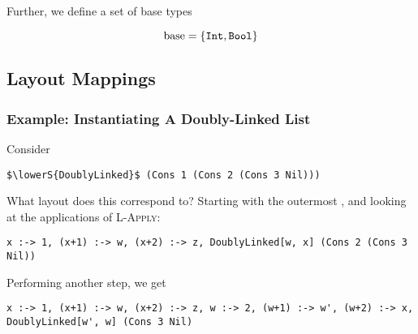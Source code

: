\documentclass[10pt]{article}
\begin{document}
Further, we define a set of base types

\[
  \textnormal{base} = \{\texttt{Int}, \texttt{Bool}\}
\]

\subsection{Layout Mappings}

%
%
%
%
%
%

\subsubsection{Example: Instantiating A Doubly-Linked List}

Consider

\begin{lstlisting}
$\lowerS{DoublyLinked}$ (Cons 1 (Cons 2 (Cons 3 Nil)))
\end{lstlisting}

What layout does this correspond to? Starting with the outermost , and looking
at the applications of \textsc{L-Apply}:

\begin{lstlisting}
x :-> 1, (x+1) :-> w, (x+2) :-> z, DoublyLinked[w, x] (Cons 2 (Cons 3 Nil))
\end{lstlisting}

Performing another step, we get

\begin{lstlisting}
x :-> 1, (x+1) :-> w, (x+2) :-> z, w :-> 2, (w+1) :-> w', (w+2) :-> x, DoublyLinked[w', w] (Cons 3 Nil)
\end{lstlisting}
\end{document}
